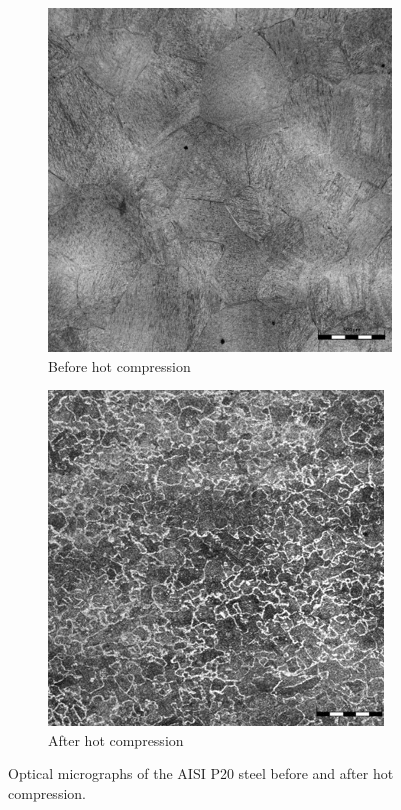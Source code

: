 \documentclass[twoside,english,1p,final,sort&compress]{elsarticle}
\theoremstyle{plain}
\begin{document}
\begin{figure}[!ht]
\centering
\begin{subfigure}[b]{0.45\textwidth}
\centering
\includegraphics[width=\textwidth]{Figures/BeforeCompM}
\caption{Before hot compression}
\end{subfigure}
\hfill
\begin{subfigure}[b]{0.45\textwidth}
\centering
\includegraphics[width=\textwidth]{Figures/AfterCompM}
\caption{After hot compression}
\end{subfigure}
\caption{Optical micrographs of the AISI P20 steel before and after hot compression.}
\label{fig:Micrography}
\end{figure}
\end{document}
